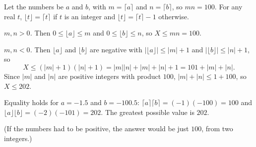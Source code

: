 Let the numbers be $a$ and $b$, with $m=\lceil a\rceil$ and $n=\lceil b\rceil$, so $mn=100$. For any real $t$, $\lfloor t\rfloor=\lceil t\rceil$ if $t$ is an integer and $\lfloor t\rfloor=\lceil t\rceil-1$ otherwise.

\emph{$m,n>0$.} Then $0\le\lfloor a\rfloor\le m$ and $0\le\lfloor b\rfloor\le n$, so $X\le mn=100$.

\emph{$m,n<0$.} Then $\lfloor a\rfloor$ and $\lfloor b\rfloor$ are negative with $\left|\lfloor a\rfloor\right|\le|m|+1$ and $\left|\lfloor b\rfloor\right|\le|n|+1$, so
\[X\le(|m|+1)(|n|+1)=|m||n|+|m|+|n|+1=101+|m|+|n| .\]
Since $|m|$ and $|n|$ are positive integers with product $100$, $|m|+|n|\le1+100$, so $X\le202$.

Equality holds for $a=-1.5$ and $b=-100.5$: $\lceil a\rceil\lceil b\rceil=(-1)(-100)=100$ and $\lfloor a\rfloor\lfloor b\rfloor=(-2)(-101)=202$. The greatest possible value is $\boxed{202}$.

(If the numbers had to be positive, the answer would be just $100$, from two integers.)
